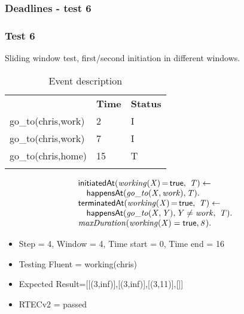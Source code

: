 \documentclass[8pt]{beamer}
\DeclareMathOperator{\val}{=}  %
\def \patsize {}
\def\happensAt{\textsf{\patsize happensAt}}
\def\initiatedAt{\textsf{\patsize initiatedAt}}
\def\terminatedAt{\textsf{\patsize terminatedAt}}
\def\true{\textsf{\patsize true}}
\newenvironment{mysplit}%
  {\arraycolsep 0pt \begin{array}{l}}%
  {\end{array}}
\begin{document}
\begin{frame}
    \frametitle{Deadlines - test 6}
    \subsubsection{Test 6}
    \small
    Sliding window test, first/second initiation in different windows.\linebreak
    \begin{minipage}{0.48\linewidth}
        \begin{table}[t!]
            \caption{Event description}
            \begin{center}

                \begin{tabular}{lll}
                    \hline\noalign{\smallskip}
                    \multicolumn{1}{l}{\textbf{Event}} & \multicolumn{1}{c}{\textbf{Time}} & \multicolumn{1}{c}{\textbf{Status}} \\
                    go\_to(chris,work)& 2 & I\\
                    go\_to(chris,work)& 7 & I\\
                    go\_to(chris,home)& 15 & T\\
                    \noalign{\smallskip}
                    \hline
                \end{tabular}
            \end{center}
        \end{table}
    \end{minipage}
    \begin{minipage}{0.48\linewidth}
        \begin{align*}
            \begin{mysplit}
                \initiatedAt\mathit{(working(X)\val\true,\ T)\leftarrow}\\
                \quad    \happensAt\mathit{(go\_to(X,work),T)}.\\
                \terminatedAt\mathit{(working(X)\val\true,\ T) \leftarrow}\\
                \quad    \happensAt\mathit{(go\_to(X,Y),Y\neq work,\ T)}.\\
                \mathit{maxDuration(working(X)=\true,8)}.\\
            \end{mysplit}
        \end{align*}
    \end{minipage}
    \begin{itemize}
        \item  Step = 4, Window = 4, Time start = 0, Time end = 16
        \item Testing Fluent = working(chris)
        \item Expected Result=[[(3,inf)],[(3,inf)],[(3,11)],[]]
        \item RTECv2 = passed
    \end{itemize}
\end{frame}
\end{document}
